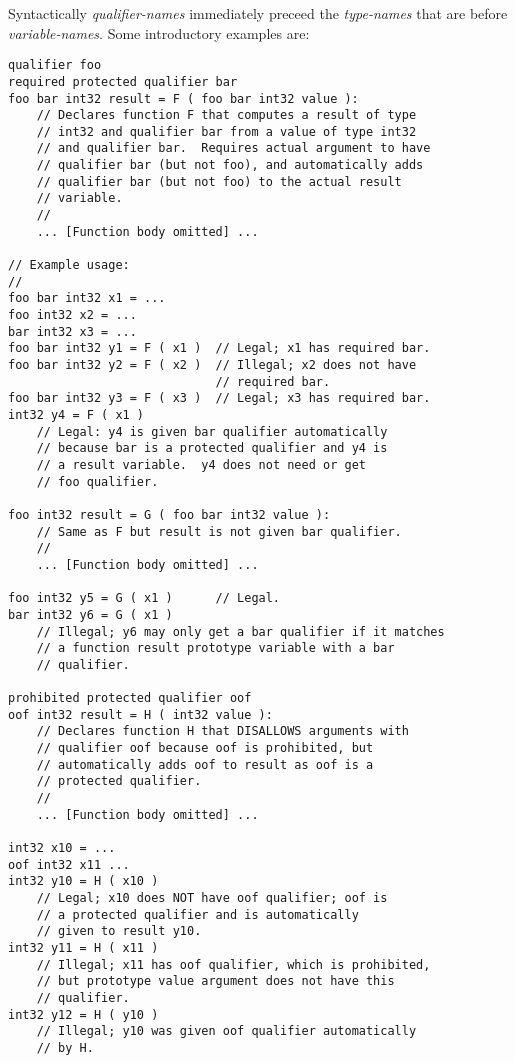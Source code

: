 \documentclass[12pt]{article}
\newenvironment{indpar}[1][0.3in]%
	{\begin{list}{}%
		     {\setlength{\itemsep}{0in}%
		      \setlength{\topsep}{0in}%
		      \setlength{\parsep}{1ex}%
		      \setlength{\labelwidth}{#1}%
		      \setlength{\leftmargin}{#1}%
		      \addtolength{\leftmargin}{\labelsep}}%
	 \item}%
	{\end{list}}
\begin{document}
Syntactically {\em qualifier-names} immediately preceed the {\em type-names}
that are before {\em variable-names}.  Some introductory examples are:
\begin{indpar}\begin{verbatim}
qualifier foo
required protected qualifier bar
foo bar int32 result = F ( foo bar int32 value ):
    // Declares function F that computes a result of type
    // int32 and qualifier bar from a value of type int32
    // and qualifier bar.  Requires actual argument to have
    // qualifier bar (but not foo), and automatically adds
    // qualifier bar (but not foo) to the actual result
    // variable.
    //
    ... [Function body omitted] ...

// Example usage:
//
foo bar int32 x1 = ...
foo int32 x2 = ...
bar int32 x3 = ...
foo bar int32 y1 = F ( x1 )  // Legal; x1 has required bar.
foo bar int32 y2 = F ( x2 )  // Illegal; x2 does not have
                             // required bar.
foo bar int32 y3 = F ( x3 )  // Legal; x3 has required bar.
int32 y4 = F ( x1 )
    // Legal: y4 is given bar qualifier automatically
    // because bar is a protected qualifier and y4 is
    // a result variable.  y4 does not need or get
    // foo qualifier.

foo int32 result = G ( foo bar int32 value ):
    // Same as F but result is not given bar qualifier.
    //
    ... [Function body omitted] ...

foo int32 y5 = G ( x1 )      // Legal.
bar int32 y6 = G ( x1 )
    // Illegal; y6 may only get a bar qualifier if it matches
    // a function result prototype variable with a bar
    // qualifier.

prohibited protected qualifier oof
oof int32 result = H ( int32 value ):
    // Declares function H that DISALLOWS arguments with
    // qualifier oof because oof is prohibited, but
    // automatically adds oof to result as oof is a
    // protected qualifier.
    //
    ... [Function body omitted] ...

int32 x10 = ...
oof int32 x11 ...
int32 y10 = H ( x10 )
    // Legal; x10 does NOT have oof qualifier; oof is
    // a protected qualifier and is automatically
    // given to result y10.
int32 y11 = H ( x11 )
    // Illegal; x11 has oof qualifier, which is prohibited,
    // but prototype value argument does not have this
    // qualifier.
int32 y12 = H ( y10 )
    // Illegal; y10 was given oof qualifier automatically
    // by H.
\end{verbatim}\end{indpar}
\end{document}

